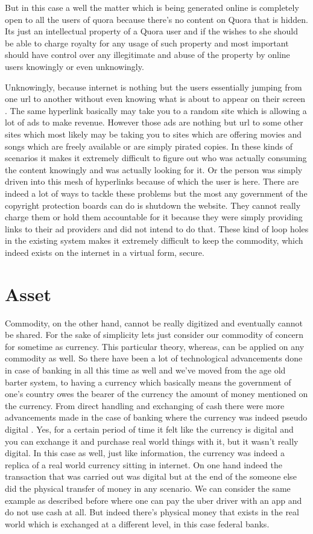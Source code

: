 But in this case a well the matter which is being generated online is completely open to all the users of quora because there's no content on Quora that is hidden. Its just an intellectual property of a Quora user and if the wishes to she should be able to charge royalty for any usage of such property and most important should have control over any illegitimate and abuse of the property by online users knowingly or even unknowingly.

Unknowingly, because internet is nothing but the users essentially jumping from one url to another without even knowing what is about to appear on their screen \cite{jane3}. The same hyperlink basically may take you to a random site which is allowing a lot of ads to make revenue. However those ads are nothing but url to some other sites which most likely may be taking you to sites which are offering movies and songs which are freely available or are simply pirated copies. In these kinds of scenarios it makes it extremely difficult to figure out who was actually consuming the content knowingly and was actually looking for it. Or the person was simply driven into this mesh of hyperlinks because of which the user is here. There are indeed a lot of ways to tackle these problems but the most any government of the copyright protection boards can do is shutdown the website. They cannot really charge them or hold them accountable for it because they were simply providing links to their ad providers and did not intend to do that. These kind of loop holes in the existing system makes it extremely difficult to keep the commodity, which indeed exists on the internet in a virtual form, secure.

\section{Asset}
Commodity, on the other hand, cannot be really digitized and eventually cannot be shared. For the sake of simplicity lets just consider our commodity of concern for sometime as currency. This particular theory, whereas, can be applied on any commodity as well. So there have been a lot of technological advancements done in case of banking in all this time as well and we've moved from the age old barter system, to having a currency which basically means the government of one's country owes the bearer of the currency the amount of money mentioned on the currency. From direct handling and exchanging of cash there were more advancements made in the case of banking where the currency was indeed pseudo digital \cite{Chen7}. Yes, for a certain period of time it felt like the currency is digital and you can exchange it and purchase real world things with it, but it wasn't really digital. In this case as well, just like information, the currency was indeed a replica of a real world currency sitting in internet. On one hand indeed the transaction that was carried out was digital but at the end of the someone else did the physical transfer of money in any scenario. We can consider the same example as described before where one can pay the uber driver with an app and do not use cash at all. But indeed there's physical money that exists in the real world which is exchanged at a different level, in this case federal banks.

